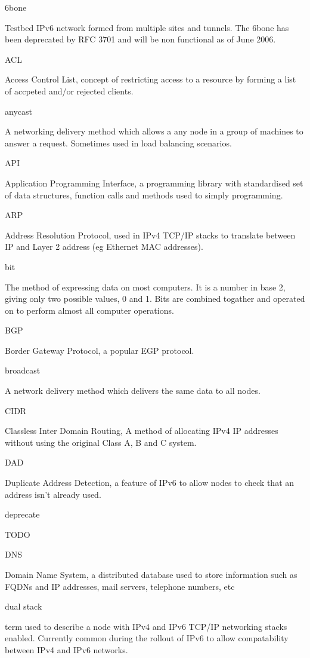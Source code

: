 6bone

Testbed IPv6 network formed from multiple sites and tunnels. The 6bone
has been deprecated by RFC 3701 and will be non functional as of June
2006.

ACL

Access Control List, concept of restricting access to a resource by
forming a list of accpeted and/or rejected clients.

anycast

A networking delivery method which allows a any node in a group of 
machines to answer a request. Sometimes used in load balancing 
scenarios.

API

Application Programming Interface, a programming library with
standardised set of data structures, function calls and methods used to
simply programming.

ARP

Address Resolution Protocol, used in IPv4 TCP/IP stacks to translate 
between IP and Layer 2 address (eg Ethernet MAC addresses).

bit

The method of expressing data on most computers. It is a number in base
2, giving only two possible values, 0 and 1. Bits are combined togather
and operated on to perform almost all computer operations.

BGP

Border Gateway Protocol, a popular EGP protocol.  

broadcast

A network delivery method which delivers the same data to all nodes.

CIDR

Classless Inter Domain Routing, A method of allocating IPv4 IP addresses
without using the original Class A, B and C system.

DAD

Duplicate Address Detection, a feature of IPv6 to allow nodes to check
that an address isn't already used.

deprecate

TODO

DNS

Domain Name System, a distributed database used to store information
such as FQDNs and IP addresses, mail servers, telephone numbers, etc

dual stack

term used to describe a node with IPv4 and IPv6 TCP/IP networking stacks
enabled. Currently common during the rollout of IPv6 to allow
compatability between IPv4 and IPv6 networks.

